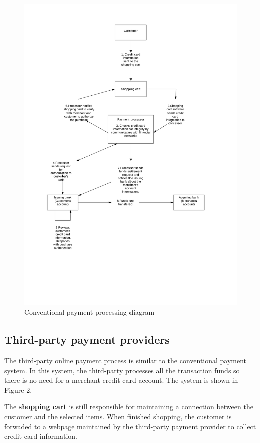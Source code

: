 \documentclass{ferseminar}
\begin{document}
\begin{figure}[p]
	\caption{Conventional payment processing diagram}
	\includegraphics[scale=0.7]{diagram1}
	\centering
\end{figure}


\subsection{Third-party payment providers}

The third-party online payment process is similar to the conventional payment system. In this system, the third-party processes all the transaction funds so there is no need for a merchant credit card account. The system is shown in Figure 2. 

The \textbf{shopping cart} is still responsible for maintaining a connection between the customer and the selected items. When finished shopping, the customer is forwaded to a webpage maintained by the third-party payment provider to collect credit card information.
\end{document}
